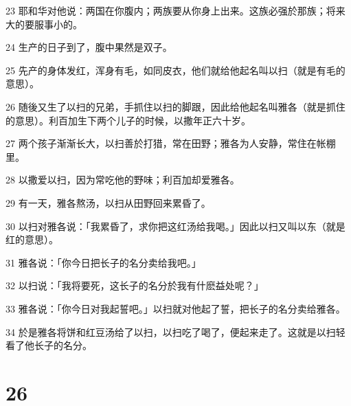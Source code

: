 \par 23 耶和华对他说：两国在你腹内；两族要从你身上出来。这族必强於那族；将来大的要服事小的。
\par 24 生产的日子到了，腹中果然是双子。
\par 25 先产的身体发红，浑身有毛，如同皮衣，他们就给他起名叫以扫（就是有毛的意思）。
\par 26 随後又生了以扫的兄弟，手抓住以扫的脚跟，因此给他起名叫雅各（就是抓住的意思）。利百加生下两个儿子的时候，以撒年正六十岁。
\par 27 两个孩子渐渐长大，以扫善於打猎，常在田野；雅各为人安静，常住在帐棚里。
\par 28 以撒爱以扫，因为常吃他的野味；利百加却爱雅各。
\par 29 有一天，雅各熬汤，以扫从田野回来累昏了。
\par 30 以扫对雅各说：「我累昏了，求你把这红汤给我喝。」因此以扫又叫以东（就是红的意思）。
\par 31 雅各说：「你今日把长子的名分卖给我吧。」
\par 32 以扫说：「我将要死，这长子的名分於我有什麽益处呢？」
\par 33 雅各说：「你今日对我起誓吧。」以扫就对他起了誓，把长子的名分卖给雅各。
\par 34 於是雅各将饼和红豆汤给了以扫，以扫吃了喝了，便起来走了。这就是以扫轻看了他长子的名分。

\chapter{26}

